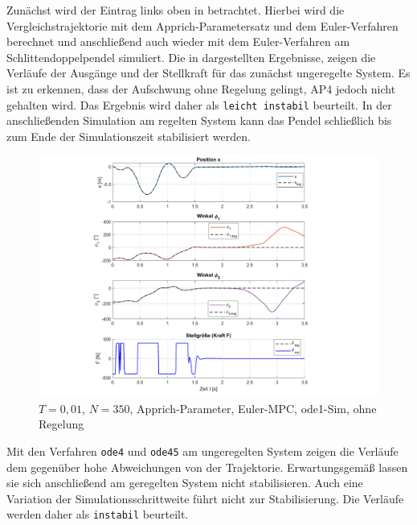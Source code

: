 Zunächst wird der Eintrag links oben in  betrachtet. Hierbei wird die Vergleichstrajektorie mit dem Apprich-Parametersatz und dem Euler-Verfahren berechnet und anschließend auch wieder mit dem Euler-Verfahren am Schlittendoppelpendel simuliert. Die in  dargestellten Ergebnisse, zeigen die Verläufe der Ausgänge und der Stellkraft für das zunächst ungeregelte System. Es ist zu erkennen, dass der Aufschwung ohne Regelung gelingt, AP4 jedoch nicht gehalten wird. Das Ergebnis wird daher als \texttt{leicht instabil} beurteilt. In der anschließenden Simulation am regelten System kann das Pendel schließlich bis zum Ende der Simulationszeit stabilisiert werden.

\begin{figure}[h]
	\centering
		\includegraphics[scale=\scaleyplots]{Bilder/Trajektorien/F400T0.01_app_euler_ode1.pdf}
	\caption{$T=0,01$, $N=350$, Apprich-Parameter, Euler-MPC, ode1-Sim, ohne Regelung}
	\label{fig:F400T0.01_app_euler_ode1}
\end{figure}

Mit den Verfahren \texttt{ode4} und \texttt{ode45} am ungeregelten System zeigen die Verläufe dem gegenüber hohe Abweichungen von der Trajektorie. Erwartungsgemäß lassen sie sich anschließend am geregelten System nicht stabilisieren. Auch eine Variation der Simulationsschrittweite führt nicht zur Stabilisierung. Die Verläufe werden daher als \texttt{instabil} beurteilt. 

